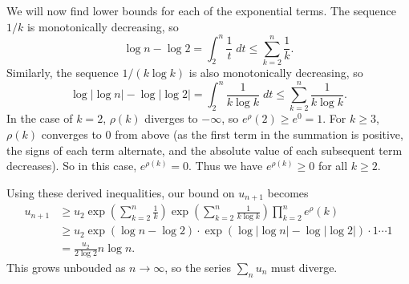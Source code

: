 \documentclass[10pt]{amsart}
\begin{document}
We will now find lower bounds for each of the exponential terms. The sequence $1/k$ is monotonically decreasing, so
\[
\log n -\log 2 = \int_{2}^{n} \frac{1}{t} \;dt \leq \sum_{k=2}^{n} \frac{1}{k} .
\] 
Similarly, the sequence $1/(k \log k)$ is also monotonically decreasing, so
\[
\log |\log n| - \log |\log 2| = \int_{2}^{n} \frac{1}{k \log k} \;dt \leq \sum_{k=2}^{n} \frac{1}{k \log k} .
\] 
In the case of $k=2$, $\rho(k)$ diverges to $-\infty$, so $e^\rho(2) \geq e^0 = 1$. For $k \geq 3$, $\rho(k)$ converges to 0 from above (as the first term in the summation is positive, the signs of each term alternate, and the absolute value of each subsequent term decreases). So in this case, $e^{\rho(k)} = 0$. Thus we have $e^{\rho(k)} \geq 0$ for all $k \geq 2$.

Using these derived inequalities, our bound on $u_{n+1}$ becomes
\begin{align*}
	u_{n+1} &\geq u_2 \exp\left( \sum_{k=2}^{n} \frac{1}{k} \right)  \exp\left( \sum_{k=2}^{n} \frac{1}{k \log k}  \right) \prod_{k=2}^n e^\rho(k) \\
		&\geq u_2 \exp(\log n - \log 2) \cdot \exp(\log |\log n| - \log |\log 2|) \cdot 1 \cdots 1 \\
		&= \frac{u_2}{2 \log 2} n \log n.
\end{align*}
This grows unbouded as $n \to \infty$, so the series $\sum_n u_n$ must diverge.
\end{document}
